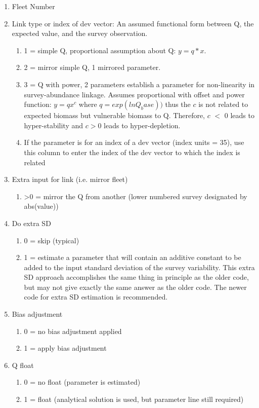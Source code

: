 \begin{enumerate}
	\item Fleet Number
	\item Link type or index of dev vector: An assumed functional form between Q, the expected value, and the survey observation.
	\begin{enumerate}
		\item 1 = simple Q, proportional assumption about Q: $y=q*x$.
		\item 2 = mirror simple Q, 1 mirrored parameter.  
		\item 3 = Q with power, 2 parameters establish a parameter for non-linearity in survey-abundance linkage.  Assumes proportional with offset and power function: $y=qx^c$ where $q = exp(lnQ_base))$ thus the $c$ is not related to expected biomass but vulnerable biomass to Q.  Therefore, $c$ $<$ 0 leads to hyper-stability and $c > 0$ leads to hyper-depletion.
		\item If the parameter is for an index of a dev vector (index units = 35), use this column to enter the index of the dev vector to which the index is related
	\end{enumerate}
	\item Extra input for link (i.e. mirror fleet)
	\begin{enumerate}
		\item >0 = mirror the Q from another (lower numbered survey designated by abs(value))
	\end{enumerate}
	\item Do extra SD
	\begin{enumerate}
		\item 0 = skip (typical)
		\item 1 = estimate a parameter that will contain an additive constant to be added to the input standard deviation of the survey variability.  This extra SD approach accomplishes the same thing in principle as the older code, but may not give exactly the same answer as the older code.  The newer code for extra SD estimation is recommended.
	\end{enumerate}
	\item Bias adjustment
	\begin{enumerate}
		\item 0 = no bias adjustment applied
		\item 1 = apply bias adjustment
	\end{enumerate}
	\item Q float
	\begin{enumerate}
		\item 0 = no float (parameter is estimated)
		\item 1 = float (analytical solution is used, but parameter line still required)
	\end{enumerate}
\end{enumerate}




